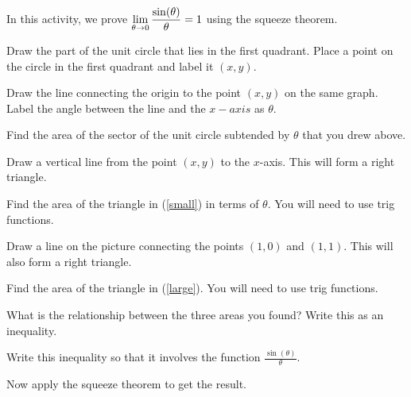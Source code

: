 \begin{activity}  \label{A:1.1.5}
In this activity, we prove $\displaystyle \lim_{\theta \to 0} \frac{\sin(\theta)}{\theta} = 1$ using the squeeze theorem.  
\ba
	\item Draw the part of the unit circle that lies in the first quadrant. Place a point on the circle in the first quadrant and label it $(x,y)$.
	\item Draw the line connecting the origin to the point $(x,y)$ on the same graph. Label the angle between the line and the $x-axis$ as $\theta$.
	\item Find the area of the sector of the unit circle subtended by $\theta$ that you drew above.
	\item Draw a vertical line from the point $(x,y)$ to the $x$-axis. This will form a right triangle. \label{small}
	\item Find the area of the triangle in (\ref{small}) in terms of $\theta$. You will need to use trig functions. 
	\item Draw a line on the picture connecting the points $(1,0)$ and $(1,1)$. This will also form a right triangle. \label{large}
	\item Find the area of the triangle in (\ref{large}). You will need to use trig functions.
	\item What is the relationship between the three areas you found? Write this as an inequality.
	\item Write this inequality so that it involves the function $\frac{\sin(\theta)}{\theta}$.
	\item Now apply the squeeze theorem to get the result.
\ea
\end{activity}


